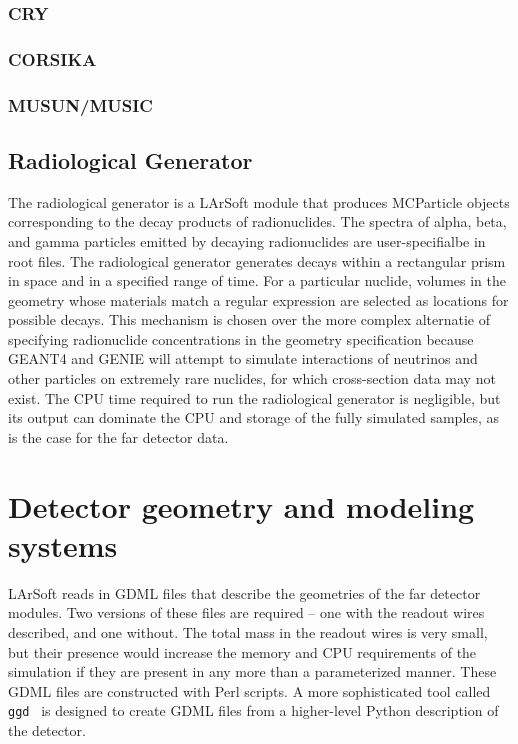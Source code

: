 \subsubsection{CRY}

\subsubsection{CORSIKA}

\subsubsection{MUSUN/MUSIC}

\subsection{Radiological Generator}

The radiological generator is a LArSoft module that produces MCParticle objects corresponding
to the decay products of radionuclides.  The spectra of alpha, beta, and gamma particles emitted
by decaying radionuclides are user-specifialbe in root files.  The radiological generator generates
decays within a rectangular prism in space and in a specified range of time.  For a particular
nuclide, volumes in the geometry whose materials match a regular expression are selected as locations
for possible decays.  This mechanism is chosen over the more complex alternatie of specifying radionuclide
concentrations in the geometry specification because GEANT4 and GENIE will attempt to simulate interactions
of neutrinos and other particles on extremely rare nuclides, for which cross-section data may not exist.
The CPU time required to run the radiological generator is negligible, but its output can dominate
the CPU and storage of the fully simulated samples, as is the case for the far detector data.

\section{Detector geometry and modeling systems}

LArSoft reads in GDML files that describe the geometries of the far detector modules.  Two versions of these
files are required -- one with the readout wires described, and one without.  The total mass in the readout
wires is very small, but their presence would increase the memory and CPU requirements of the simulation
if they are present in any more than a parameterized manner.  These GDML files are constructed with Perl scripts.
A more sophisticated tool called {\tt{ggd}}~\cite{ggd} is designed to create GDML files from a higher-level
Python description of the detector.

